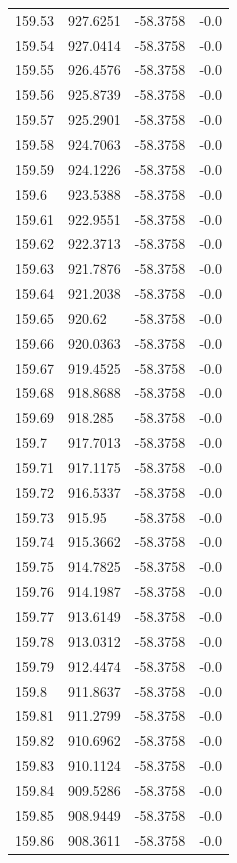 \begin{table}[H]
\begin{tabular}{llll}
159.53 & 927.6251 & -58.3758 & -0.0 \\
159.54 & 927.0414 & -58.3758 & -0.0 \\
159.55 & 926.4576 & -58.3758 & -0.0 \\
159.56 & 925.8739 & -58.3758 & -0.0 \\
159.57 & 925.2901 & -58.3758 & -0.0 \\
159.58 & 924.7063 & -58.3758 & -0.0 \\
159.59 & 924.1226 & -58.3758 & -0.0 \\
159.6 & 923.5388 & -58.3758 & -0.0 \\
159.61 & 922.9551 & -58.3758 & -0.0 \\
159.62 & 922.3713 & -58.3758 & -0.0 \\
159.63 & 921.7876 & -58.3758 & -0.0 \\
159.64 & 921.2038 & -58.3758 & -0.0 \\
159.65 & 920.62 & -58.3758 & -0.0 \\
159.66 & 920.0363 & -58.3758 & -0.0 \\
159.67 & 919.4525 & -58.3758 & -0.0 \\
159.68 & 918.8688 & -58.3758 & -0.0 \\
159.69 & 918.285 & -58.3758 & -0.0 \\
159.7 & 917.7013 & -58.3758 & -0.0 \\
159.71 & 917.1175 & -58.3758 & -0.0 \\
159.72 & 916.5337 & -58.3758 & -0.0 \\
159.73 & 915.95 & -58.3758 & -0.0 \\
159.74 & 915.3662 & -58.3758 & -0.0 \\
159.75 & 914.7825 & -58.3758 & -0.0 \\
159.76 & 914.1987 & -58.3758 & -0.0 \\
159.77 & 913.6149 & -58.3758 & -0.0 \\
159.78 & 913.0312 & -58.3758 & -0.0 \\
159.79 & 912.4474 & -58.3758 & -0.0 \\
159.8 & 911.8637 & -58.3758 & -0.0 \\
159.81 & 911.2799 & -58.3758 & -0.0 \\
159.82 & 910.6962 & -58.3758 & -0.0 \\
159.83 & 910.1124 & -58.3758 & -0.0 \\
159.84 & 909.5286 & -58.3758 & -0.0 \\
159.85 & 908.9449 & -58.3758 & -0.0 \\
159.86 & 908.3611 & -58.3758 & -0.0 \\

\end{tabular}
\end{table}
